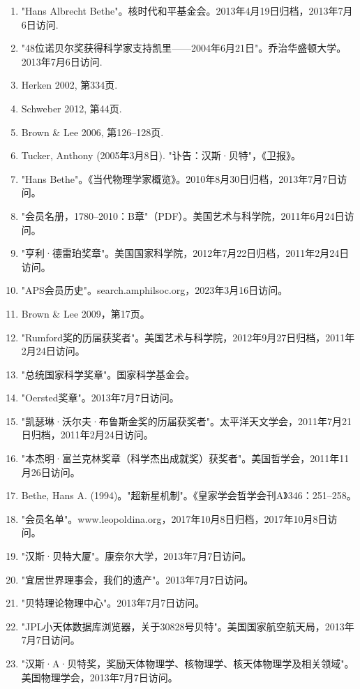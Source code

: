 \begin{enumerate}
\item "Hans Albrecht Bethe"。核时代和平基金会。2013年4月19日归档，2013年7月6日访问.  
\item "48位诺贝尔奖获得科学家支持凯里——2004年6月21日"。乔治华盛顿大学。2013年7月6日访问.  
\item Herken 2002, 第334页.  
\item Schweber 2012, 第44页.  
\item Brown & Lee 2006, 第126–128页.
\item Tucker, Anthony (2005年3月8日). "讣告：汉斯·贝特"，《卫报》。  
\item "Hans Bethe"。《当代物理学家概览》。2010年8月30日归档，2013年7月7日访问。  
\item "会员名册，1780–2010：B章"（PDF）。美国艺术与科学院，2011年6月24日访问。  
\item "亨利·德雷珀奖章"。美国国家科学院，2012年7月22日归档，2011年2月24日访问。  
\item "APS会员历史"。search.amphilsoc.org，2023年3月16日访问。  
\item Brown & Lee 2009，第17页。
\item "Rumford奖的历届获奖者"。美国艺术与科学院，2012年9月27日归档，2011年2月24日访问。  
\item "总统国家科学奖章"。国家科学基金会。  
\item "Oersted奖章"。2013年7月7日访问。  
\item "凯瑟琳·沃尔夫·布鲁斯金奖的历届获奖者"。太平洋天文学会，2011年7月21日归档，2011年2月24日访问。  
\item "本杰明·富兰克林奖章（科学杰出成就奖）获奖者"。美国哲学会，2011年11月26日访问。  
\item Bethe, Hans A. (1994)。"超新星机制"。《皇家学会哲学会刊A》346：251–258。
\item "会员名单"。www.leopoldina.org，2017年10月8日归档，2017年10月8日访问。  
\item "汉斯·贝特大厦"。康奈尔大学，2013年7月7日访问。  
\item "宜居世界理事会，我们的遗产"。2013年7月7日访问。  
\item "贝特理论物理中心"。2013年7月7日访问。  
\item "JPL小天体数据库浏览器，关于30828号贝特"。美国国家航空航天局，2013年7月7日访问。  
\item "汉斯·A·贝特奖，奖励天体物理学、核物理学、核天体物理学及相关领域"。美国物理学会，2013年7月7日访问。
\end{enumerate}
